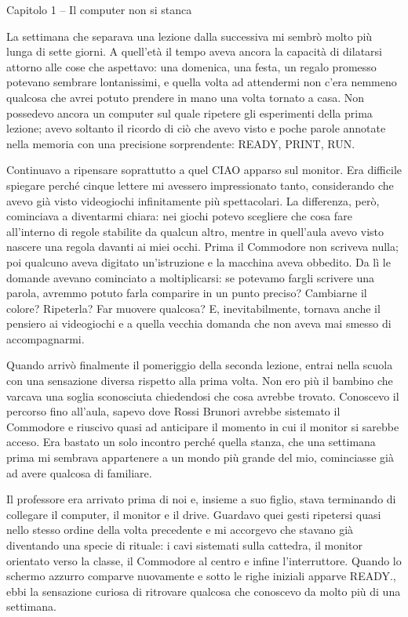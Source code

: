 \documentclass{article}
\author{utente}
\date{2026-08-18}
\begin{document}
Capitolo 1 – Il computer non si stanca

La settimana che separava una lezione dalla successiva mi sembrò molto più lunga di sette giorni. A quell'età il tempo
aveva ancora la capacità di dilatarsi attorno alle cose che aspettavo: una domenica, una festa, un regalo promesso
potevano sembrare lontanissimi, e quella volta ad attendermi non c'era nemmeno qualcosa che avrei potuto prendere in
mano una volta tornato a casa. Non possedevo ancora un computer sul quale ripetere gli esperimenti della prima lezione;
avevo soltanto il ricordo di ciò che avevo visto e poche parole annotate nella memoria con una precisione sorprendente:
READY, PRINT, RUN.

Continuavo a ripensare soprattutto a quel CIAO apparso sul monitor. Era difficile spiegare perché cinque lettere mi
avessero impressionato tanto, considerando che avevo già visto videogiochi infinitamente più spettacolari. La
differenza, però, cominciava a diventarmi chiara: nei giochi potevo scegliere che cosa fare all'interno di regole
stabilite da qualcun altro, mentre in quell'aula avevo visto nascere una regola davanti ai miei occhi. Prima il
Commodore non scriveva nulla; poi qualcuno aveva digitato un'istruzione e la macchina aveva obbedito. Da lì le domande
avevano cominciato a moltiplicarsi: se potevamo fargli scrivere una parola, avremmo potuto farla comparire in un punto
preciso? Cambiarne il colore? Ripeterla? Far muovere qualcosa? E, inevitabilmente, tornava anche il pensiero ai
videogiochi e a quella vecchia domanda che non aveva mai smesso di accompagnarmi.

Quando arrivò finalmente il pomeriggio della seconda lezione, entrai nella scuola con una sensazione diversa rispetto
alla prima volta. Non ero più il bambino che varcava una soglia sconosciuta chiedendosi che cosa avrebbe trovato.
Conoscevo il percorso fino all'aula, sapevo dove Rossi Brunori avrebbe sistemato il Commodore e riuscivo quasi ad
anticipare il momento in cui il monitor si sarebbe acceso. Era bastato un solo incontro perché quella stanza, che una
settimana prima mi sembrava appartenere a un mondo più grande del mio, cominciasse già ad avere qualcosa di familiare.

Il professore era arrivato prima di noi e, insieme a suo figlio, stava terminando di collegare il computer, il monitor e
il drive. Guardavo quei gesti ripetersi quasi nello stesso ordine della volta precedente e mi accorgevo che stavano già
diventando una specie di rituale: i cavi sistemati sulla cattedra, il monitor orientato verso la classe, il Commodore
al centro e infine l'interruttore. Quando lo schermo azzurro comparve nuovamente e sotto le righe iniziali apparve
READY., ebbi la sensazione curiosa di ritrovare qualcosa che conoscevo da molto più di una settimana.
\end{document}
